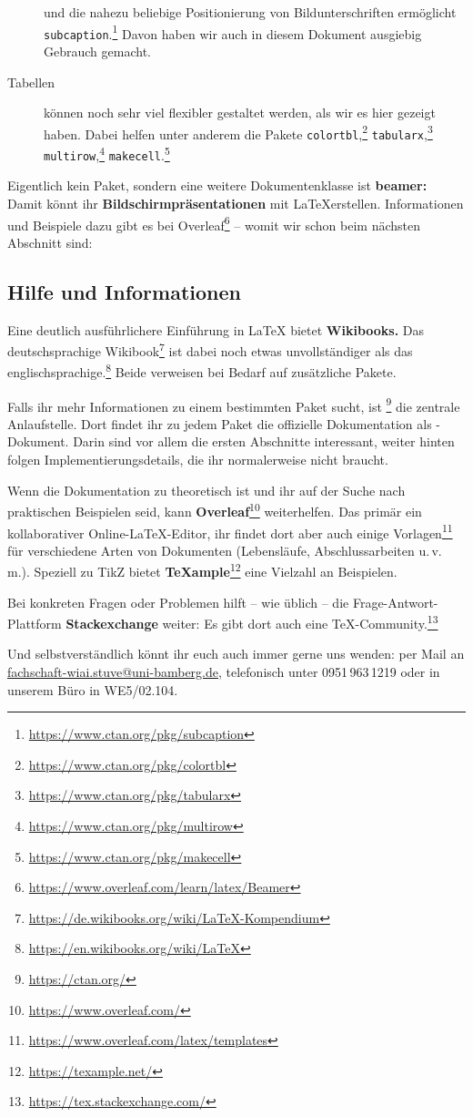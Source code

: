 \begin{description}
		und die nahezu beliebige Positionierung von Bildunterschriften ermöglicht \texttt{subcaption}.\footnote{\url{https://www.ctan.org/pkg/subcaption}}
		Davon haben wir auch in diesem Dokument ausgiebig Gebrauch gemacht.
	\item[Tabellen]
		können noch sehr viel flexibler gestaltet werden, als wir es hier gezeigt haben.
		Dabei helfen unter anderem die Pakete 
		\texttt{colortbl},\footnote{\url{https://www.ctan.org/pkg/colortbl}}
		\texttt{tabularx},\footnote{\url{https://www.ctan.org/pkg/tabularx}}
		\texttt{multirow},\footnote{\url{https://www.ctan.org/pkg/multirow}}
		\texttt{makecell}.\footnote{\url{https://www.ctan.org/pkg/makecell}}
\end{description}

\noindent Eigentlich kein Paket, sondern eine weitere Dokumentenklasse ist \textbf{beamer:} Damit könnt ihr \textbf{Bildschirmpräsentationen} mit \LaTeX erstellen.
Informationen und Beispiele dazu gibt es bei Overleaf\footnote{\url{https://www.overleaf.com/learn/latex/Beamer}} –
womit wir schon beim nächsten Abschnitt sind:

\subsection{Hilfe und Informationen}

Eine deutlich ausführlichere Einführung in \LaTeX{} bietet \textbf{Wikibooks.}
Das deutschsprachige Wikibook\footnote{\url{https://de.wikibooks.org/wiki/LaTeX-Kompendium}} ist dabei noch etwas unvollständiger als das englischsprachige.\footnote{\url{https://en.wikibooks.org/wiki/LaTeX}}
Beide verweisen bei Bedarf auf zusätzliche Pakete.

Falls ihr mehr Informationen zu einem bestimmten Paket sucht, ist \footnote{\url{https://ctan.org/}} die zentrale Anlaufstelle.
Dort findet ihr zu jedem Paket die offizielle Dokumentation als -Dokument.
Darin sind vor allem die ersten Abschnitte interessant, weiter hinten folgen Implementierungsdetails, die ihr normalerweise nicht braucht.

Wenn die Dokumentation zu theoretisch ist und ihr auf der Suche nach praktischen Beispielen seid, kann \textbf{Overleaf}\footnote{\url{https://www.overleaf.com/}} weiterhelfen.
Das primär ein kollaborativer Online-\LaTeX-Editor, ihr findet dort aber auch einige Vorlagen\footnote{\url{https://www.overleaf.com/latex/templates}} für verschiedene Arten von Dokumenten (Lebensläufe, Abschlussarbeiten u.\,v.\,m.).
Speziell zu TikZ bietet \textbf{\TeX{}ample}\footnote{\url{https://texample.net/}} eine Vielzahl an Beispielen.

Bei konkreten Fragen oder Problemen hilft – wie üblich – die Frage-Antwort-Plattform \textbf{Stackexchange} weiter:
Es gibt dort auch eine \TeX-Community.\footnote{\url{https://tex.stackexchange.com/}}

Und selbstverständlich könnt ihr euch auch immer gerne uns wenden:
per Mail an \href{mailto:fachschaft-wiai.stuve@uni-bamberg.de}{fachschaft-wiai.stuve@uni-bamberg.de}, telefonisch unter 0951\,963\,1219 oder in unserem Büro in WE5/02.104.
